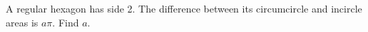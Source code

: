 A regular hexagon has side 2. The difference between its circumcircle and incircle areas is $a\pi$. Find $a$.
